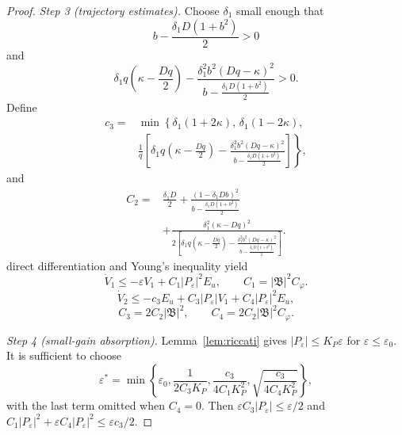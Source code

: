 \documentclass[journal]{IEEEtran}
\newcommand{\eps}{\varepsilon}
\newcommand{\Bcal}{\mathfrak B}
\newcommand{\abs}[1]{\left|#1\right|}
\begin{document}
\begin{proof}
\emph{Step 3 (trajectory estimates).} Choose \(\delta_1\) small enough that
\begin{equation}
 b-\frac{\delta_1D(1+b^2)}2>0
\end{equation}
and
\begin{equation}
 \delta_1q\left(\kappa-\frac{Dq}{2}\right)
 -\frac{\delta_1^2b^2(Dq-\kappa)^2}
 {b-\frac{\delta_1D(1+b^2)}2}>0.
\end{equation}
Define
\begin{align}
 c_3={}&\min\left\{
 \delta_1(1+2\kappa),\,
 \delta_1(1-2\kappa),\right.\nonumber\\
 &\left.
 \frac{1}{q}\left[
 \delta_1q\left(\kappa-\frac{Dq}{2}\right)
 -\frac{\delta_1^2b^2(Dq-\kappa)^2}
 {b-\frac{\delta_1D(1+b^2)}2}
 \right]\right\}, \label{eq:c3_direct}
\end{align}
and
\begin{align}
 C_2={}&\frac{\delta_1D}{2}
 +\frac{(1-\delta_1Db)^2}
 {b-\frac{\delta_1D(1+b^2)}2}\nonumber\\
 &+\frac{\delta_1^2(\kappa-Dq)^2}
 {2\left[\delta_1q\left(\kappa-\frac{Dq}{2}\right)
 -\frac{\delta_1^2b^2(Dq-\kappa)^2}
 {b-\frac{\delta_1D(1+b^2)}2}\right]}. \label{eq:C2_direct}
\end{align}
direct differentiation and Young's inequality yield
\begin{equation}
 \dot V_1\leq-\eps V_1+C_1\abs{P_\eps}^2E_u,
 \qquad C_1=\abs{\Bcal}^{2}C_\varphi. \label{eq:V1_estimate}
\end{equation}
\begin{equation}
 \dot V_2\leq-c_3E_u+C_3\abs{P_\eps}V_1
       +C_4\abs{P_\eps}^2E_u,
\end{equation}
\begin{equation}
 C_3=2C_2\abs{\Bcal}^{2},\qquad
 C_4=2C_2\abs{\Bcal}^{2}C_\varphi. \label{eq:V2_estimate}
\end{equation}

\emph{Step 4 (small-gain absorption).} Lemma~\ref{lem:riccati} gives \(\abs{P_\eps}\leq K_P\eps\) for \(\eps\leq\eps_0\). It is sufficient to choose
\begin{equation}
 \eps^*=\min\left\{\eps_0,\frac{1}{2C_3K_P},
 \frac{c_3}{4C_1K_P^2},
 \sqrt{\frac{c_3}{4C_4K_P^2}}\right\}, \label{eq:eps_star_general}
\end{equation}
with the last term omitted when \(C_4=0\). Then \(\eps C_3\abs{P_\eps}\leq\eps/2\) and \(C_1\abs{P_\eps}^2+\eps C_4\abs{P_\eps}^2\leq\eps c_3/2\).


\end{proof}
\end{document}

